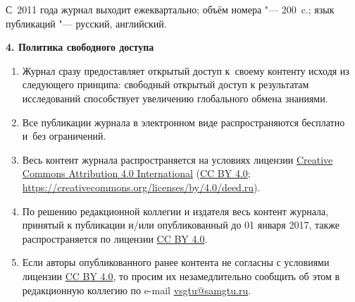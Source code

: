 С~2011 года журнал выходит ежеквартально; объём номера "--- 200~c.; язык публикаций "--- русский, английский.



\smallskip



\smallskip



\smallskip



\noindent

{\bf 4. Политика свободного доступа}



\begin{enumerate}

\item[1.] Журнал сразу предоставляет открытый доступ к~своему контенту исходя из следующего принципа: свободный открытый доступ к результатам исследований способствует увеличению глобального обмена знаниями.



\item[2.] Все публикации журнала в электронном виде распространяются бесплатно и~без ограничений.



\item[3.] Весь контент журнала распространяется на условиях лицензии \href{https://creativecommons.org/licenses/by/4.0/deed.ru}{Creative Co\-m\-mons Attribution 4.0 Inter\-na\-tio\-nal} (\href{https://creativecommons.org/licenses/by/4.0/deed.ru}{CC BY 4.0}; \url{https://creativecommons.org/licenses/by/4.0/deed.ru}).



\item[4.] По решению редакционной коллегии и издателя весь контент журнала, принятый к публикации и/или опубликованный до 01 января 2017, также распространяется по лицензии \href{https://creativecommons.org/licenses/by/4.0/deed.ru}{CC BY 4.0}. 



\item[5.] Если авторы опубликованного ранее контента не согласны с условиями лицензии \href{https://creativecommons.org/licenses/by/4.0/deed.ru}{CC BY 4.0}, то просим их незамедлительно сообщить об этом в редакционную коллегию по e-mail \href{mailto:vsgtu@samgtu.ru}{vsgtu@samgtu.ru}.



\end{enumerate}



